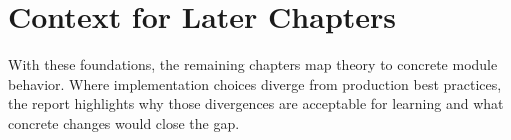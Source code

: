 \section{Context for Later Chapters}
With these foundations, the remaining chapters map theory to concrete module behavior. Where implementation choices diverge from production best practices, the report highlights why those divergences are acceptable for learning and what concrete changes would close the gap.
